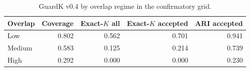 \begin{table}[t]
\centering
\caption{GuardK v0.4 by overlap regime in the confirmatory grid.}
\label{tab:overlap}
\begin{tabular}{lrrrr}
\toprule
Overlap & Coverage & Exact-$K$ all & Exact-$K$ accepted & ARI accepted\\
\midrule
Low & 0.802 & 0.562 & 0.701 & 0.941\\
Medium & 0.583 & 0.125 & 0.214 & 0.739\\
High & 0.292 & 0.000 & 0.000 & 0.230\\
\bottomrule
\end{tabular}
\end{table}
